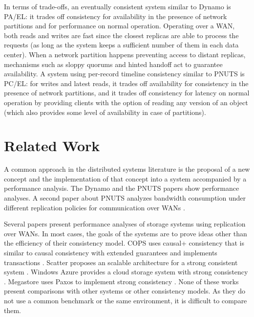 \documentclass[man,floatsintext,12pt]{apa6}
\begin{document}
In terms of trade-offs, an eventually consistent system similar to
Dynamo is PA/EL: it trades off consistency for availability in the presence of
network partitions and for performance on normal operation. Operating over a
WAN, both reads and writes are fast since the closest replicas are able to
process the requests (as long as the system keeps a sufficient number of them
in each data center). When a network partition happens preventing access to
distant replicas, mechanisms such as sloppy quorums and hinted handoff act to
guarantee availability. A system using per-record timeline consistency similar
to PNUTS is PC/EL: for writes and latest reads, it trades off availability for
consistency in the presence of network partitions, and it trades off
consistency for latency on normal operation by providing clients with the
option of reading any version of an object (which also provides some level of
availability in case of partitions).

\section{Related Work}

A common approach in the distributed systems literature is the proposal of a
new concept and the implementation of that concept into a system accompanied by
a performance analysis. The Dynamo \parencite{DeCandia2007} and the PNUTS papers
\parencite{Cooper2008} show performance analyses. A second paper about PNUTS
analyzes bandwidth consumption under different replication policies for
communication over WANs \parencite{Kadambi2011}.

Several papers present performance analyses of storage systems using
replication over WANs. In most cases, the goals of the systems are to prove
ideas other than the efficiency of their consistency model. COPS uses causal+
consistency that is similar to causal consistency with extended guarantees and
implements transactions \parencite{Lloyd2011}. Scatter proposes an scalable
architecture for a strong consistent system \parencite{Glendenning2011}. Windows
Azure provides a cloud storage system with strong consistency
\parencite{Calder2011}. Megastore uses Paxos to implement strong consistency
\parencite{Baker2011}. None of these works present comparisons with other systems or
other consistency models. As they do not use a common benchmark or the same
environment, it is difficult to compare them.
\end{document}
